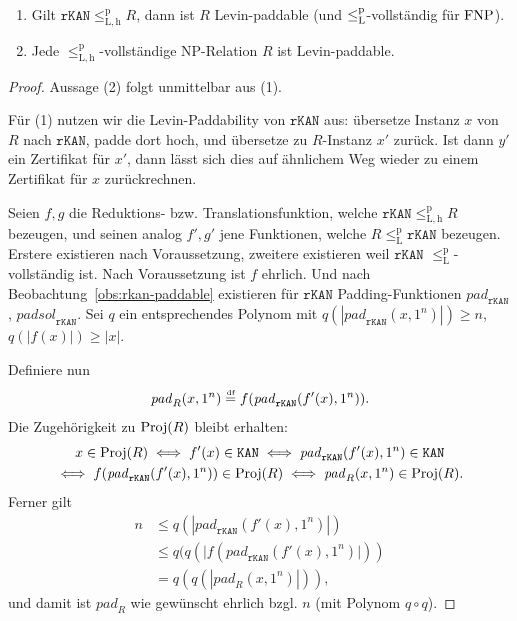 \begin{lemma}\label{obs:invcomplete-sind-levinpaddable}
    \begin{enumerate}
        \item Gilt $\mathtt{rKAN}\leq_\mathrm{L,h}^\mathrm{p} R$, dann ist $R$ Levin-paddable (und $\leq_\mathrm{L}^\mathrm{p}$-vollständig für $\mathrm{FNP}$).
        \item Jede $\leq_\mathrm{L,h}^\mathrm{p}$-vollständige NP-Relation $R$ ist Levin-paddable.
    \end{enumerate}
\end{lemma}
\begin{proof}
    Aussage (2) folgt unmittelbar aus (1).

    Für (1) nutzen wir die Levin-Paddability von $\mathtt{rKAN}$ aus: übersetze Instanz $x$ von $R$ nach $\mathtt{rKAN}$, padde dort hoch, und übersetze zu $R$-Instanz $x'$ zurück. Ist dann $y'$ ein Zertifikat für $x'$, dann lässt sich dies auf ähnlichem Weg wieder zu einem Zertifikat für $x$ zurückrechnen.

    Seien $f, g$ die Reduktions- bzw. Translationsfunktion, welche $\mathtt{rKAN}\leq_\mathrm{L,h}^\mathrm p R$ bezeugen, und seinen analog $f', g'$ jene Funktionen, welche $R\leq_\mathrm{L}^\mathrm p \mathtt{rKAN}$ bezeugen. Erstere existieren nach Voraussetzung, zweitere existieren weil $\mathtt{rKAN}$ $\leq_\mathrm{L}^\mathrm p$-vollständig ist.
    Nach Voraussetzung ist $f$ ehrlich. %
    Und nach Beobachtung~\ref{obs:rkan-paddable} existieren für $\mathtt{rKAN}$ Padding-Funktionen $\mathit{pad}_\mathtt{rKAN}$, $\mathit{padsol}_\mathtt{rKAN}$.
    Sei $q$ ein entsprechendes Polynom mit $q(|\mathit{pad}_\mathtt{rKAN}(x, 1^n)|)\geq n$, $q(|f(x)|) \geq |x|$.

    Definiere nun
    \[ \mathit{pad}_R(x, 1^n) \stackrel{\text{{\normalfont\tiny df}}}{=}  f(\mathit{pad}_\mathtt{rKAN}(f'(x), 1^n)). \]
    Die Zugehörigkeit zu $\operatorname{Proj}(R)$ bleibt erhalten:
    \begin{gather*}
        x\in \operatorname{Proj}(R) \iff f'(x) \in \mathtt{KAN} \iff \mathit{pad}_\mathtt{rKAN}(f'(x), 1^n) \in \mathtt{KAN}\\ \iff f(\mathit{pad}_\mathtt{rKAN}(f'(x), 1^n)) \in \operatorname{Proj}(R) \iff \mathit{pad}_R(x, 1^n) \in\operatorname{Proj}(R).
    \end{gather*}
    Ferner gilt
    \begin{align*} 
        n &\leq q(|\mathit{pad}_\mathtt{rKAN}(f'(x), 1^n)|)\\
    &\leq q(q(|f(\mathit{pad}_\mathtt{rKAN}(f'(x), 1^n)|))\\
    &=q(q(|\mathit{pad}_R(x, 1^n)|)),
    \end{align*}
    und damit ist $\mathit{pad}_R$ wie gewünscht ehrlich bzgl. $n$ (mit Polynom $q\circ q$).


\end{proof}
